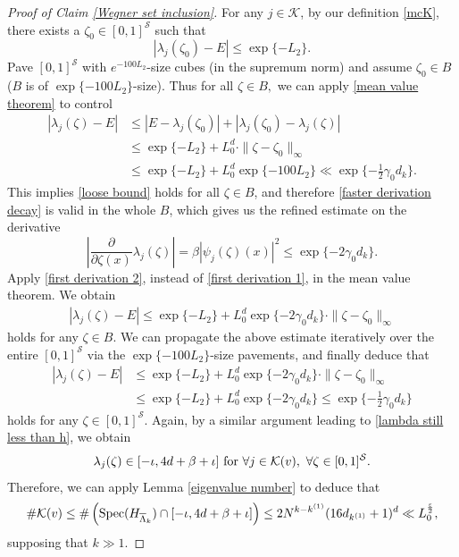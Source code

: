 \documentclass[11pt,reqno,UTF8,twoside]{amsart}
\newcommand{\spec}{{\rm Spec}}
\newcommand{\barLambda}{\overline{\Lambda}}
\newcommand{\mcS}{\mathcal{S}}
\newcommand{\mcK}{\mathcal{K}}
\theoremstyle{definition}
\numberwithin{equation}{section}
\begin{document}
\begin{proof}[Proof of Claim \ref{Wegner set inclusion}]
For any  $j\in \mcK$, by our definition \eqref{mcK}, there exists  a $\zeta_0\in [0,1]^{\mcS}$ such that
\[|\lambda_j(\zeta_0)-E|\leq \exp\{-L_2 \}.\]
Pave $[0,1]^{\mcS}$ with $e^{-100L_2}$-size cubes (in  the supremum  norm) and assume $\zeta_0\in B$ ($B$  is  of $\exp\{-100L_2\}$-size). Thus for all $\zeta \in B,$  we can apply \eqref{mean value theorem} to control
\begin{align*}
  |\lambda_j(\zeta)-E| & \leq |E-\lambda_j(\zeta_0)| + |\lambda_j(\zeta_0)-\lambda_j(\zeta)| \\
           & \leq \exp\{-L_2\}+ L_0^d \cdot \|\zeta-\zeta_0\|_{\infty} \\
           & \leq \exp\{-L_2\}+ L_0^d \exp\{-100L_2\} \ll \exp\{-\frac{1}{2}\gamma_0 d_k \}.
\end{align*}
This implies \eqref{loose bound} holds for all $\zeta\in B$, and therefore \eqref{faster derivation decay} is valid in the whole $B$, which gives us the refined estimate on the derivative 
\begin{equation}\label{first derivation 2}
  \left|\frac{\partial}{\partial \zeta (x)} \lambda_j(\zeta)\right|=\beta |\psi_j(\zeta)(x)|^2 \leq \exp\{-2\gamma_0 d_k\}.
\end{equation}
Apply \eqref{first derivation 2}, instead of \eqref{first derivation 1}, in the mean value theorem. We obtain 
\begin{align*}
  |\lambda_j(\zeta)-E| \leq \exp\{-L_2\}+ L_0^d \exp\{-2\gamma_0 d_k\}\cdot \|\zeta-\zeta_0\|_{\infty} 
\end{align*}
holds for any $\zeta \in B$. We can propagate the above estimate iteratively over the entire $[0,1]^{\mcS}$ via the $\exp\{-100L_2\}$-size pavements, and finally deduce that 
\begin{align*}
  |\lambda_j(\zeta)-E| & \leq \exp\{-L_2\}+ L_0^d \exp\{-2\gamma_0 d_k\}\cdot \|\zeta-\zeta_0\|_{\infty} \\
      & \leq \exp\{-L_2\}+ L_0^d \exp\{-2\gamma_0 d_k\} \leq \exp\{-\frac{1}{2}\gamma_0 d_k\}
\end{align*}
holds for any $\zeta\in [0,1]^{\mcS}$. Again, by a similar argument  leading to \eqref{lambda still less than h}, we obtain 
\[\lambda_j(\zeta)\in [-\iota,4d+\beta+\iota]\ {\rm for}\ \forall j\in \mcK(v),\ \forall \zeta\in [0,1]^{\mcS}.\]
Therefore, we can apply Lemma \ref{eigenvalue number} to deduce that 
\[\# \mcK(v)\leq \# \left(\spec(H_{\barLambda_k})\cap [-\iota,4d+\beta+\iota] \right) \leq 2 N^{k-k^{(1)}} (16d_{k^{(1)}}+1)^{d} \ll L_0^{\frac{\varepsilon}{2}},\]
supposing that $k\gg1$. 


\end{proof}
\end{document}
